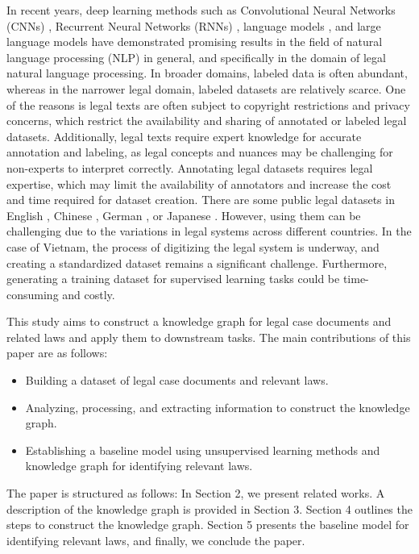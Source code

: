 \documentclass[conference]{IEEEtran}
\begin{document}
In recent years, deep learning methods such as Convolutional Neural Networks (CNNs) \cite{Gao2014ModelingIW, hu2014convolutional}, Recurrent Neural Networks (RNNs) \cite{palangi2016deep}, language models \cite{devlin2018bert, beltagy2020longformer}, and large language models \cite{ni2021sentence,touvron2023llama} have demonstrated promising results in the field of natural language processing (NLP) in general, and specifically in the domain of legal natural language processing. In broader domains, labeled data is often abundant, whereas in the narrower legal domain, labeled datasets are relatively scarce. One of the reasons is legal texts are often subject to copyright restrictions and privacy concerns, which restrict the availability and sharing of annotated or labeled legal datasets. Additionally, legal texts require expert knowledge for accurate annotation and labeling, as legal concepts and nuances may be challenging for non-experts to interpret correctly. Annotating legal datasets requires legal expertise, which may limit the availability of annotators and increase the cost and time required for dataset creation. There are some public legal datasets in English \cite{rabelo2020summary}, Chinese \cite{huang2020named}, German \cite{leitner2019fine}, or Japanese \cite{rabelo2020summary}. However, using them can be challenging due to the variations in legal systems across different countries. In the case of Vietnam, the process of digitizing the legal system is underway, and creating a standardized dataset remains a significant challenge. Furthermore, generating a training dataset for supervised learning tasks could be time-consuming and costly.

This study aims to construct a knowledge graph for legal case documents and related laws and apply them to downstream tasks. The main contributions of this paper are as follows:
\begin{itemize}
    \item Building a dataset of legal case documents and relevant laws.
    \item Analyzing, processing, and extracting information to construct the knowledge graph.
    \item Establishing a baseline model using unsupervised learning methods and knowledge graph for identifying relevant laws.
\end{itemize}

The paper is structured as follows: In Section 2, we present related works. A description of the knowledge graph is provided in Section 3. Section 4 outlines the steps to construct the knowledge graph. Section 5 presents the baseline model for identifying relevant laws, and finally, we conclude the paper.
\end{document}
